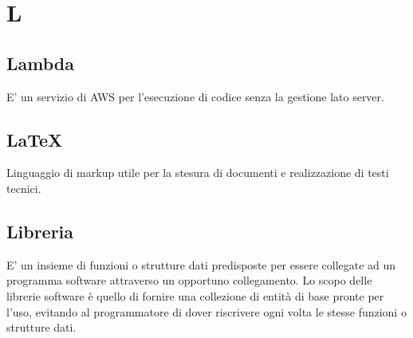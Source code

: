\section*{L}

\subsection{Lambda}
E' un servizio di AWS per l'esecuzione di codice senza la gestione lato server.

\subsection{LaTeX}
Linguaggio di markup utile per la stesura di documenti e realizzazione di testi tecnici. 

\subsection{Libreria}
E' un insieme di funzioni o strutture dati predisposte per essere collegate ad un programma software attraverso un opportuno collegamento.
Lo scopo delle librerie software è quello di fornire una collezione di entità di base pronte per l'uso, evitando al programmatore di dover riscrivere ogni volta le stesse funzioni o strutture dati.